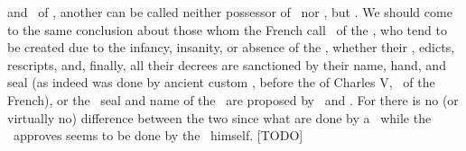 \documentclass[12pt,twoside]{memoir}
\begin{document}
and \proprietarius\ of \imperium,  another can be called
 neither possessor of \imperium\ nor \dominus, but \custos.
We should come to the same conclusion about those whom the French
call \regentes\ of the \regnum, who tend to be created
due to the infancy, insanity, or absence of the \rex,
whether their \leges, edicts, rescripts, and, finally, all their decrees
are sanctioned by their name, hand, and seal
(as indeed was done by ancient custom ,
before the \lex of Charles V, \Rex\ of the  French),
or the \regius\ seal and name of the \reges\
are proposed by \leges\ and \mandata.
For there is no (or virtually no) difference between the two since
what are done by a \procurator\ while the \dominus\ approves
seems to be done by the \dominus\ himself.%
[TODO] %



\englatglossary
\end{document}

